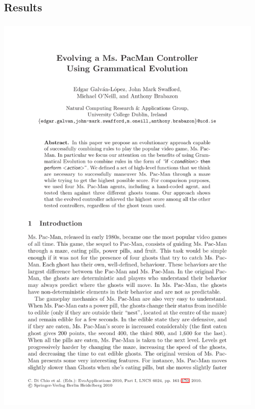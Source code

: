 \documentclass{beamer}
\makeatletter
\newcommand*{\currentname}{\@currentlabelname}
\makeatother
\begin{document}
\subsection{Results}
\begin{frame}
\frametitle{\currentname}

\includegraphics[page=9, trim={3.5cm 10.5cm 3.5cm 3cm}, clip, scale=0.75]{PacMan_GE.pdf}


\end{frame}
\end{document}
